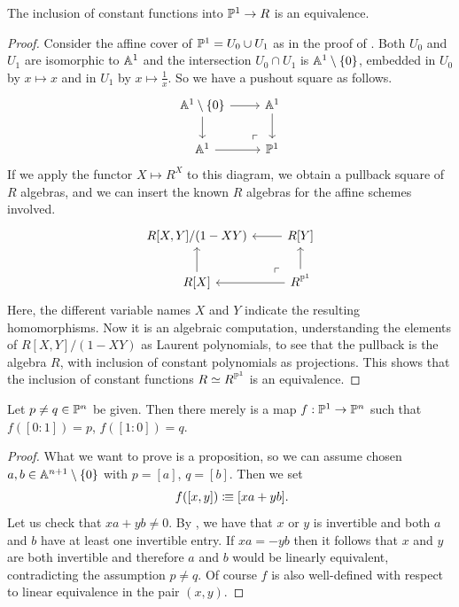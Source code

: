 \begin{lemma}%
  \label{functions-on-projective-line-constant}
  The inclusion of constant functions into $\mathbb{P}^1 \to R$ is an equivalence.
\end{lemma}

\begin{proof}
  Consider the affine cover of $\mathbb{P}^1 = U_0 \cup U_1$
  as in the proof of .
  Both $U_0$ and $U_1$ are isomorphic to $\mathbb{A}^1$
  and the intersection $U_0 \cap U_1$ is $\mathbb{A}^1 \setminus \{0\}$,
  embedded in $U_0$ by $x \mapsto x$
  and in $U_1$ by $x \mapsto \frac{1}{x}$.
  So we have a pushout square as follows.
  \[ \begin{tikzcd}
    \A^1 \setminus \{0\} \ar[r] \ar[d]
    \ar[dr, phantom, very near end, "\ulcorner"] &
    \A^1 \ar[d] \\
    \A^1 \ar[r] &
    \bP^1
  \end{tikzcd} \]
  If we apply the functor $X \mapsto R^X$ to this diagram,
  we obtain a pullback square of $R$ algebras,
  and we can insert the known $R$ algebras for the affine schemes involved.
  \[ \begin{tikzcd}
    R[X, Y]/(1 - XY) &
    R[Y] \ar[l] \\
    R[X] \ar[u] &
    R^{\bP^1} \ar[l] \ar[u]
    \ar[lu, phantom, very near start, "\ulcorner"]
  \end{tikzcd} \]
  Here, the different variable names $X$ and $Y$ indicate
  the resulting homomorphisms.
  Now it is an algebraic computation,
  understanding the elements of $R[X, Y]/(1 - XY)$ as Laurent polynomials,
  to see that the pullback is the algebra $R$,
  with inclusion of constant polynomials as projections.
  This shows that the inclusion of constant functions $R\simeq R^{\mathbb{P}^1} $ is an equivalence.
\end{proof}

\begin{lemma}%
  \label{parametrized-line-through-two-points-in-projective-space}
  Let $p \neq q \in \mathbb{P}^n$ be given.
  Then there merely is a map $f : \mathbb{P}^1 \to \mathbb{P}^n$
  such that $f([0 : 1]) = p$, $f([1 : 0]) = q$.
\end{lemma}

\begin{proof}
  What we want to prove is a proposition,
  so we can assume chosen $a, b \in \mathbb{A}^{n+1} \setminus \{0\}$
  with $p = [a]$, $q = [b]$.
  Then we set
  \[ f([x, y]) \colonequiv [xa + yb] \rlap{.}\]
  Let us check that $xa + yb \neq 0$.
  By ,
  we have that $x$ or $y$ is invertible
  and both $a$ and $b$ have at least one invertible entry.
  If $xa = - yb$
  then it follows that $x$ and $y$ are both invertible
  and therefore $a$ and $b$ would be linearly equivalent,
  contradicting the assumption $p \neq q$.
  Of course $f$ is also well-defined
  with respect to linear equivalence in the pair $(x, y)$.
\end{proof}


